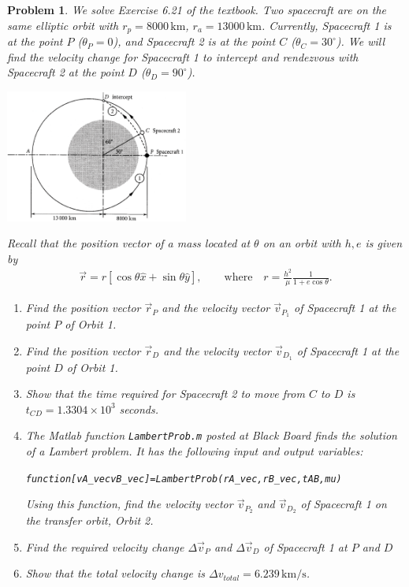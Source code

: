 \documentclass[10pt]{article}
\renewcommand{\baselinestretch}{1.2}
\theoremstyle{plain}\theorembodyfont{\normalfont}
\newtheorem{prob}{Problem}[section]
\newenvironment{subprob}%
{\renewcommand{\theenumi}{\alph{enumi}}\renewcommand{\labelenumi}{(\theenumi)}\begin{enumerate}}%
{\end{enumerate}}%
\newenvironment{matlab}
{\begin{alltt}\small\renewcommand{\baselinestretch}{1.2}\selectfont}%
{\end{alltt}}
\begin{document}
\begin{prob}
We solve Exercise 6.21 of the textbook. Two spacecraft are on the same elliptic orbit with $r_p=8000\,\mathrm{km}$, $r_a=13000\,\mathrm{km}$. Currently, Spacecraft 1 is at the point $P$ ($\theta_P=0$), and Spacecraft 2 is at the point $C$ ($\theta_C=30^\circ$). We will find the velocity change for Spacecraft 1 to intercept and rendezvous with Spacecraft 2 at the point $D$ ($\theta_D=90^\circ$).

\vspace*{0.2cm}
\centerline{\includegraphics[width=0.45\textwidth]{prob2.eps}}

Recall that the position vector of a mass located at $\theta$ on an orbit with $h,e$ is given by
\begin{align*}
\vec r = r [\cos\theta \hat x + \sin\theta\hat y],\qquad \text{where}\quad r=\frac{h^2}{\mu}\frac{1}{1+e\cos\theta}.
\end{align*}


\begin{subprob}
\item Find the position vector $\vec r_P$ and the velocity vector $\vec v_{P_1}$ of Spacecraft 1 at the point $P$ of Orbit 1.
\item Find the position vector $\vec r_D$ and the velocity vector $\vec v_{D_1}$ of Spacecraft 1 at the point $D$ of Orbit 1.
\item Show that the time required for Spacecraft 2 to move from $C$ to $D$ is $t_{CD}=1.3304\times 10^3$ seconds.
\item The Matlab function \texttt{LambertProb.m} posted at Black Board finds the solution of a Lambert problem. It has the following input and output variables: 

\begin{matlab}
function [vA_vec vB_vec]=LambertProb(rA_vec,rB_vec,tAB,mu)
\end{matlab}
Using this function, find the velocity vector $\vec v_{P_2}$ and $\vec v_{D_2}$ of Spacecraft 1 on the transfer orbit, Orbit 2.

\item Find the required velocity change $\Delta \vec v_P$ and $\Delta \vec v_D$ of Spacecraft 1 at $P$ and $D$
\item Show that the total velocity change is $\Delta v_{total}=6.239\,\mathrm{km/s}$.

\end{subprob}
\end{prob}
\end{document}
